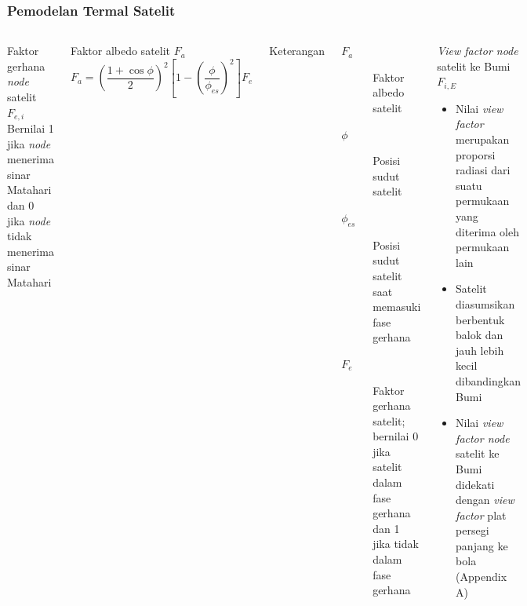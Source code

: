 \documentclass[8pt]{beamer}
\begin{document}
\begin{frame}
  \frametitle{Pemodelan Termal Satelit}
  \begin{columns}[T]
    \begin{block}{\center \normalsize Faktor gerhana \textit{node} satelit $F_{e,i}$}
      Bernilai 1 jika \textit{node} menerima sinar Matahari dan 0 jika \textit{node} tidak menerima sinar Matahari
    \end{block}
    \begin{block}{\center \normalsize Faktor albedo satelit $F_a$}
      \begin{equation}
\label{eq:albedofactor}
F_a = \left( \frac{1 + \cos{\phi}}{2} \right)^2 \left[ 1 - \left( \frac{\phi}{\phi_{es}} \right)^2 \right] F_e
\end{equation}
    \end{block}
    \center Keterangan
    \small
      \begin{description}
        \item[$F_a$] Faktor albedo satelit
        \item[$\phi$] Posisi sudut satelit
        \item[$\phi_{es}$] Posisi sudut satelit saat memasuki fase gerhana
        \item[$F_e$] Faktor gerhana satelit; bernilai 0 jika satelit dalam fase gerhana dan 1 jika tidak dalam fase gerhana

\end{description}
    \begin{block}{\center \normalsize \textit{View factor node} satelit ke Bumi $F_{i,E}$}
      \begin{itemize}
        \item Nilai \textit{view factor} merupakan proporsi radiasi dari suatu permukaan yang diterima oleh permukaan lain
        \item Satelit diasumsikan berbentuk balok dan jauh lebih kecil dibandingkan Bumi
        \item Nilai \textit{view factor node} satelit ke Bumi didekati dengan \textit{view factor} plat persegi panjang ke bola (Appendix A)
      \end{itemize}
    \end{block}
  \end{columns}
\end{frame}
\end{document}
